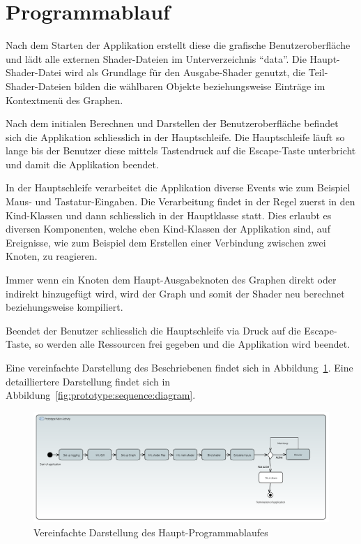 
\section{Programmablauf}
\label{sec:prototype:sequence}

Nach dem Starten der Applikation erstellt diese die grafische
Benutzeroberfläche und lädt alle externen Shader-Dateien im Unterverzeichnis 
``data''. Die Haupt-Shader-Datei wird als Grundlage für den Ausgabe-Shader
genutzt, die Teil-Shader-Dateien bilden die wählbaren Objekte beziehungsweise
Einträge im Kontextmenü des Graphen.

Nach dem initialen Berechnen und Darstellen der Benutzeroberfläche befindet
sich die Applikation schliesslich in der Hauptschleife. Die Hauptschleife läuft
so lange bis der Benutzer diese mittels Tastendruck auf die Escape-Taste
unterbricht und damit die Applikation beendet.

In der Hauptschleife verarbeitet die Applikation diverse Events wie zum
Beispiel Maus- und Tastatur-Eingaben. Die Verarbeitung findet in der Regel
zuerst in den Kind-Klassen und dann schliesslich in der Hauptklasse statt. Dies
erlaubt es diversen Komponenten, welche eben Kind-Klassen der Applikation sind,
auf Ereignisse, wie zum Beispiel dem Erstellen einer Verbindung zwischen zwei
Knoten, zu reagieren.

Immer wenn ein Knoten dem Haupt-Ausgabeknoten des Graphen direkt oder indirekt
hinzugefügt wird, wird der Graph und somit der Shader neu berechnet
beziehungsweise kompiliert.

Beendet der Benutzer schliesslich die Hauptschleife via Druck auf die
Escape-Taste, so werden alle Ressourcen frei gegeben und die Applikation wird
beendet.

Eine vereinfachte Darstellung des Beschriebenen findet sich in
Abbildung~\ref{fig:prototype:sequence:activity}. Eine detailliertere
Darstellung findet sich in Abbildung~\ref{fig:prototype:sequence:diagram}.

\begin{figure}[H]
    \centering
    \includegraphics[width=1.0\textwidth]{img/prototype_activity_diagram.pdf}
    \caption{Vereinfachte Darstellung des
        Haupt-Programmablaufes}\label{fig:prototype:sequence:activity}
\end{figure}

